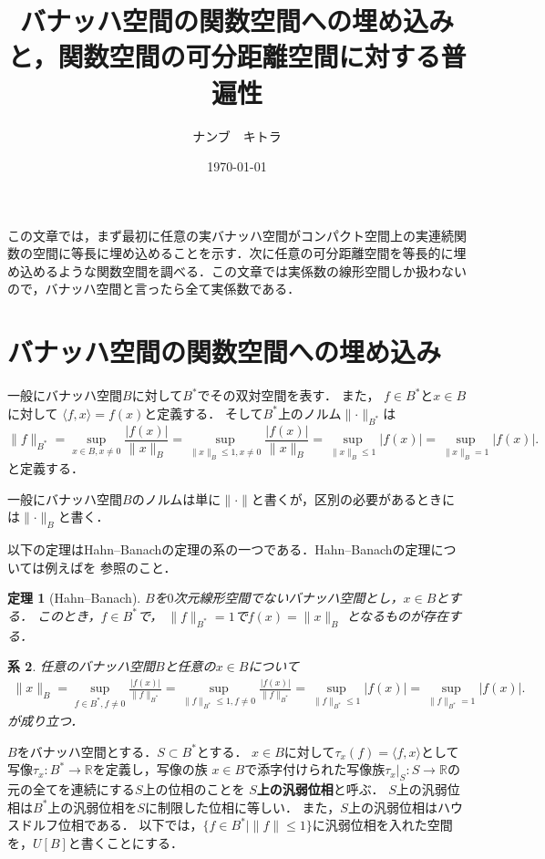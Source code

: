 \documentclass[leqno, a4paper, 12pt]{jsarticle}
\title{バナッハ空間の関数空間への埋め込みと，関数空間の可分距離空間に対する普遍性}
\author{ナンブ　キトラ}
\date{\today}
\newtheorem{thm}{定理}
\newtheorem{cor}[thm]{系}
\newcommand{\rr}{\mathbb{R}}
\begin{document}
\maketitle

この文章では，まず最初に任意の実バナッハ空間がコンパクト空間上の実連続関数の空間に等長に埋め込めることを示す．次に任意の可分距離空間を等長的に埋め込めるような関数空間を調べる．この文章では実係数の線形空間しか扱わないので，バナッハ空間と言ったら全て実係数である．

\section{バナッハ空間の関数空間への埋め込み}


一般にバナッハ空間$B$に対して$B^*$でその双対空間を表す．
また，
$f\in B^*$と$x\in B$に対して
$\langle f, x\rangle=f(x)$と定義する．
そして$B^*$上のノルム$\lVert\cdot\rVert_{B^*}$は
\[
\|f\|_{B^*}=\sup_{x\in B, x\neq 0}\frac{|f(x)|}{\|x\|_B}=
\sup_{\|x\|_B\le 1, x\neq 0}\frac{|f(x)|}{\|x\|_B}
=
\sup_{\|x\|_B\le 1}|f(x)|
=\sup_{\|x\|_B=1}|f(x)|.
\]
と定義する．


一般にバナッハ空間$B$のノルムは単に$\lVert\cdot\rVert$と書くが，区別の必要があるときには$\lVert\cdot\rVert_B$と書く．


以下の定理はHahn--Banachの定理の系の一つである．Hahn--Banachの定理については例えば\cite{kaiseki}を
参照のこと．
\begin{thm}[Hahn--Banach]
$B$を$0$次元線形空間でないバナッハ空間とし，$x\in B$とする．
このとき，$f\in B^*$で，
$\|f\|_{B^*}=1$で$f(x)=\|x\|_B$
となるものが存在する．
\end{thm}


\begin{cor}\label{cor:norm}
任意のバナッハ空間$B$と任意の$x\in B$について
\begin{align*}
\|x\|_B=\sup_{f\in B^*, f\neq 0}\frac{|f(x)|}{\|f\|_{B^*}}=
\sup_{\|f\|_{B^*}\le 1, f\neq 0}\frac{|f(x)|}{\|f\|_{B^*}}=
\sup_{\|f\|_{B^*}\le 1}|f(x)|
=
\sup_{\|f\|_{B^*}=1}|f(x)|.
\end{align*}
が成り立つ．
\end{cor}

$B$をバナッハ空間とする．$S\subset B^*$とする．
$x\in B$に対して$\tau_x(f)=\langle f, x\rangle $として写像$\tau_x: B^*\to \rr$を定義し，写像の族
$x\in B$で添字付けられた写像族$\left.\tau_x\right|_S\colon S\to \rr$の元の全てを連続にする$S$上の位相のことを
\textbf{$S$上の汎弱位相}と呼ぶ．
$S$上の汎弱位相は$B^*$上の汎弱位相を$S$に制限した位相に等しい．
また，$S$上の汎弱位相はハウスドルフ位相である．
以下では，$\{f\in B^*\mid \|f\|\le 1\}$に汎弱位相を入れた空間を，$U[B]$と書くことにする．
\end{document}
